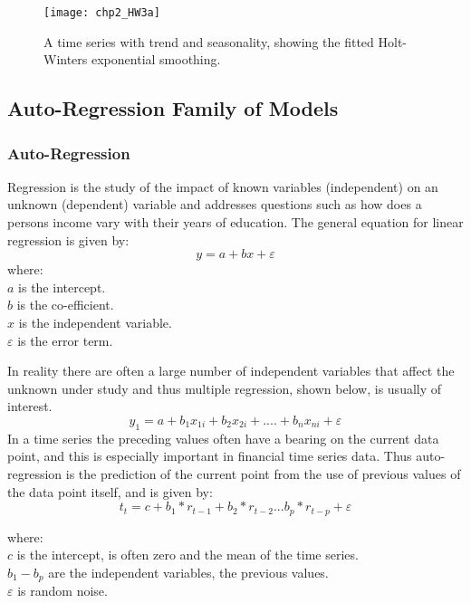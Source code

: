 \begin{figure}[tbph!]
\centering
\texttt{[image: chp2\_HW3a]}
\caption[A time series with trend and seasonality plus exponential smoothing]{A time series with trend and seasonality, showing the fitted Holt-Winters exponential smoothing.}
\label{fig:HW3a}
\end{figure}



\subsection{Auto-Regression Family of Models}

\subsubsection{Auto-Regression}
\label{sec:autoregression}
Regression is the study of the impact of known variables (independent) on an unknown (dependent) variable and addresses questions such as how does a persons income vary with their years of education. The general equation for linear regression is given by:
\[ y = a + bx + \varepsilon \]
where:\\
$ a $ is the intercept.\\
$ b $ is the co-efficient.\\
$ x $ is the independent variable.\\
$ \varepsilon $ is the error term.

In reality there are often a large number of independent variables that affect the unknown under study and thus multiple regression, shown below, is usually of interest.
\[ y_{1} = a + b_{1}x_{1i} + b_{2}x_{2i} +  ....   +b_{n}x_{ni} + \varepsilon\]
In a time series the preceding values often have a bearing on the current data point, and this is especially important in financial time series data. Thus auto-regression is the prediction of the current point from the use of previous values of the data point itself, and is given by:
\[ t_{t}=c+b_{1}*r_{t-1}+b_{2}*r_{t-2}...b_{p}*r_{t-p}+ \varepsilon \]

where:\\
$ c $ is the intercept, is often zero and the mean of the time series. \\
$ b_{1}-b_{p} $ are the independent variables, the previous values.\\
$ \varepsilon $ is random noise. 

